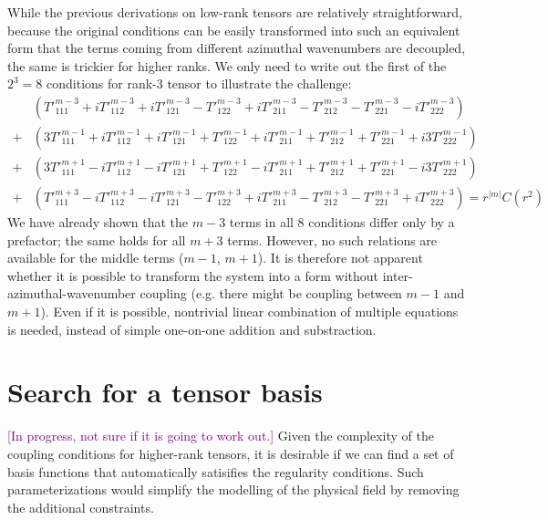 \documentclass[a4paper, 11pt]{article}
\newcommand{\todoitem}[1]{\textcolor{purple}{[#1]}}
\begin{document}
While the previous derivations on low-rank tensors are relatively straightforward, because the original conditions can be easily transformed into such an equivalent form that the terms coming from different azimuthal wavenumbers are decoupled, the same is trickier for higher ranks. We only need to write out the first of the $2^3 = 8$ conditions for rank-$3$ tensor to illustrate the challenge:
\[\begin{aligned}
    &\left(T'^{m-3}_{111} + iT'^{m-3}_{112} + iT'^{m-3}_{121} - T'^{m-3}_{122} + i T'^{m-3}_{211} - T'^{m-3}_{212} - T'^{m-3}_{221} - i T'^{m-3}_{222}\right) \\ 
    +& \left(3T'^{m-1}_{111} + iT'^{m-1}_{112} + iT'^{m-1}_{121} + T'^{m-1}_{122} + i T'^{m-1}_{211} + T'^{m-1}_{212} + T'^{m-1}_{221} + i3 T'^{m-1}_{222}\right) \\ 
    +& \left(3T'^{m+1}_{111} - iT'^{m+1}_{112} - iT'^{m+1}_{121} + T'^{m+1}_{122} - i T'^{m+1}_{211} + T'^{m+1}_{212} + T'^{m+1}_{221} - i3 T'^{m+1}_{222}\right) \\ 
    +&\left(T'^{m+3}_{111} - iT'^{m+3}_{112} - iT'^{m+3}_{121} - T'^{m+3}_{122} + i T'^{m+3}_{211} - T'^{m+3}_{212} - T'^{m+3}_{221} + i T'^{m+3}_{222}\right) = r^{|m|} C(r^2)
\end{aligned}\]
We have already shown that the $m-3$ terms in all $8$ conditions differ only by a prefactor; the same holds for all $m+3$ terms. However, no such relations are available for the middle terms ($m-1$, $m+1$). It is therefore not apparent whether it is possible to transform the system into a form without inter-azimuthal-wavenumber coupling (e.g. there might be coupling between $m-1$ and $m+1$). Even if it is possible, nontrivial linear combination of multiple equations is needed, instead of simple one-on-one addition and substraction.


\section{Search for a tensor basis}

\todoitem{In progress, not sure if it is going to work out.}
Given the complexity of the coupling conditions for higher-rank tensors, it is desirable if we can find a set of basis functions that automatically satisifies the regularity conditions. Such parameterizations would simplify the modelling of the physical field by removing the additional constraints.
\end{document}
